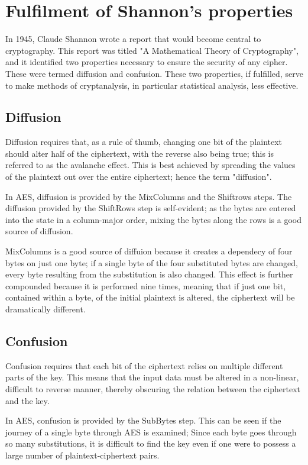 \documentclass[12pt]{report}
\theoremstyle{definition}
\theoremstyle{remark}
\begin{document}
\section{Fulfilment of Shannon's properties}
In 1945, Claude Shannon wrote a report that would become central to cryptography. This report was titled "A Mathematical Theory of Cryptography", and it identified two properties necessary to ensure the security of any cipher\cite{ShannonProperties}. These were termed diffusion and confusion. These two properties, if fulfilled, serve to make methods of cryptanalysis, in particular statistical analysis, less effective.

\subsection{Diffusion}
Diffusion requires that, as a rule of thumb, changing one bit of the plaintext should alter half of the ciphertext, with the reverse also being true; this is referred to as the avalanche effect\cite{AvalancheEffect}. This is best achieved by spreading the values of the plaintext out over the entire ciphertext; hence the term "diffusion".

In AES, diffusion is  provided by the MixColumns and the Shiftrows steps. The diffusion provided by the ShiftRows step is self-evident; as the bytes are entered into the state in a column-major order, mixing the bytes along the rows is a good source of diffusion.

MixColumns is a good source of diffuion because it creates a dependecy of four bytes on just one byte; if a single byte of the four substituted bytes are changed, every byte resulting from the substitution is also changed. This effect is further compounded because it is performed nine times, meaning that if just one bit, contained within a byte, of the initial plaintext is altered, the ciphertext will be dramatically different.

\subsection{Confusion}
Confusion requires that each bit of the ciphertext relies on multiple different parts of the key. This means that the input data must be altered in a non-linear, difficult to reverse manner, thereby obscuring the relation between the ciphertext and the key\cite{Confusion}.

In AES, confusion is provided by the SubBytes step. This can be seen if the journey of a single byte through AES is examined; Since each byte goes through so many substitutions, it is difficult to find the key even if one were to possess a large number of plaintext-ciphertext pairs.
\end{document}

